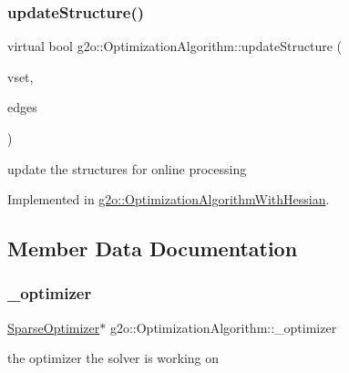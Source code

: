 \subsubsection{\texorpdfstring{update\+Structure()}{updateStructure()}}
{\footnotesize\ttfamily virtual bool g2o\+::\+Optimization\+Algorithm\+::update\+Structure (\begin{DoxyParamCaption}\item[{const std\+::vector$<$ \mbox{\hyperlink{classg2o_1_1_hyper_graph_1_1_vertex}{Hyper\+Graph\+::\+Vertex}} $\ast$$>$ \&}]{vset,  }\item[{const \mbox{\hyperlink{classg2o_1_1_hyper_graph_a5e2970e236c0dcb4eff7c205d7b6b4ae}{Hyper\+Graph\+::\+Edge\+Set}} \&}]{edges }\end{DoxyParamCaption})\hspace{0.3cm}{\ttfamily [pure virtual]}}

update the structures for online processing 

Implemented in \mbox{\hyperlink{classg2o_1_1_optimization_algorithm_with_hessian_adadb23f135e037ce760f4415a0f26269}{g2o\+::\+Optimization\+Algorithm\+With\+Hessian}}.



\subsection{Member Data Documentation}
\mbox{\label{classg2o_1_1_optimization_algorithm_a6017c344be0d9f09d6674849849c6b60}} 
\subsubsection{\texorpdfstring{\+\_\+optimizer}{\_optimizer}}
{\footnotesize\ttfamily \mbox{\hyperlink{classg2o_1_1_sparse_optimizer}{Sparse\+Optimizer}}$\ast$ g2o\+::\+Optimization\+Algorithm\+::\+\_\+optimizer\hspace{0.3cm}{\ttfamily [protected]}}



the optimizer the solver is working on 

\mbox{\label{classg2o_1_1_optimization_algorithm_ae37b494f69b483a3fcafa944e987e325}} 
